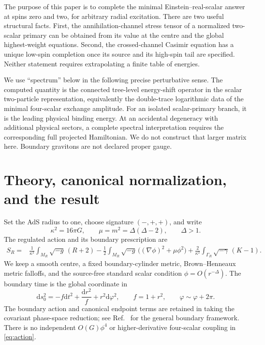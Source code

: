 \documentclass[11pt,a4paper]{article}
\numberwithin{equation}{section}
\theoremstyle{remark}\newtheorem{remark}[theorem]{Remark}
\newcommand{\dd}{\mathrm d}
\newcommand{\kap}{\kappa}
\begin{document}
The purpose of this paper is to complete the minimal Einstein--real-scalar answer at spins zero and two, for arbitrary radial excitation. There are two useful structural facts. First, the annihilation-channel stress tensor of a normalized two-scalar primary can be obtained from its value at the centre and the global highest-weight equations. Second, the crossed-channel Casimir equation has a unique low-spin completion once its source and its high-spin tail are specified. Neither statement requires extrapolating a finite table of energies.

We use ``spectrum'' below in the following precise perturbative sense. The computed quantity is the connected tree-level energy-shift operator in the scalar two-particle representation, equivalently the double-trace logarithmic data of the minimal four-scalar exchange amplitude. For an isolated scalar-primary branch, it is the leading physical binding energy. At an accidental degeneracy with additional physical sectors, a complete spectral interpretation requires the corresponding full projected Hamiltonian. We do not construct that larger matrix here. Boundary gravitons are not declared proper gauge.

\section{Theory, canonical normalization, and the result}
\label{sec:result}

Set the AdS radius to one, choose signature $(-,+,+)$, and write
\begin{equation}
 \kap^2=16\pi G,\qquad \mu=m^2=\Delta(\Delta-2),\qquad \Delta>1.
\end{equation}
The regulated action and its boundary prescription are
\begin{align}
 S_R={}&\frac1{\kap^2}\int_{M_R}\!\sqrt{-g}\,(R+2)
 -\frac12\int_{M_R}\!\sqrt{-g}\,\bigl((\nabla\phi)^2+\mu\phi^2\bigr)
 +\frac2{\kap^2}\int_{\Gamma_R}\!\sqrt{-\gamma}\,(K-1).
 \label{eq:action}
\end{align}
We keep a smooth centre, a fixed boundary-cylinder metric, Brown--Henneaux metric falloffs, and the source-free standard scalar condition $\phi=O(r^{-\Delta})$. The boundary time is the global coordinate in
\begin{equation}
 \dd s_0^2=-f\dd t^2+\frac{\dd r^2}{f}+r^2\dd\varphi^2,
 \qquad f=1+r^2,\qquad \varphi\sim\varphi+2\pi.
\end{equation}
The boundary action and canonical endpoint terms are retained in taking the covariant phase-space reduction; see Ref.~\cite{HW} for the general boundary framework. There is no independent $O(G)\phi^4$ or higher-derivative four-scalar coupling in \eqref{eq:action}.
\end{document}
